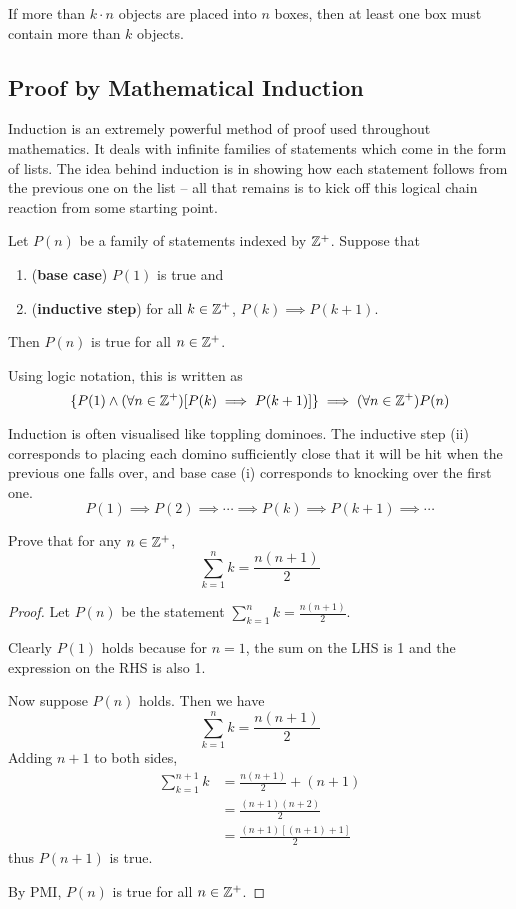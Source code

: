 \begin{theorem}
If more than $k\cdot n$ objects are placed into $n$ boxes, then at least one box must contain more than $k$ objects.
\end{theorem}
\pagebreak

\subsection{Proof by Mathematical Induction}
Induction is an extremely powerful method of proof used throughout mathematics. It deals with infinite families of statements which come in the form of lists. The idea behind induction is in showing how each statement follows from the previous one on the list -- all that remains is to kick off this logical chain reaction from some starting point.

\begin{theorem}
Let $P(n)$ be a family of statements indexed by $\mathbb Z^+$. Suppose that 
\begin{enumerate}[label=(\roman*)]
\item (\textbf{base case}) $P(1)$ is true and
\item (\textbf{inductive step}) for all $k\in\mathbb Z^+$, $P(k)\implies P(k+1)$.
\end{enumerate}
Then $P(n)$ is true for all $n\in\mathbb Z^+$.
\end{theorem}

Using logic notation, this is written as
\[ \{P(1) \land (\forall n \in \mathbb Z^+) [P(k) \implies P(k+1)]\} \implies (\forall n \in \mathbb Z^+)P(n) \]

Induction is often visualised like toppling dominoes. The inductive step (ii) corresponds to placing each domino sufficiently close that it will be hit when the previous one falls over, and base case (i) corresponds to knocking over the first one.
\[ P(1) \implies P(2) \implies \cdots \implies P(k) \implies P(k+1) \implies \cdots \]

\begin{exercise}{}{}
Prove that for any $n \in \mathbb Z^+$,
\[ \sum_{k=1}^n k = \frac{n(n+1)}{2} \]
\end{exercise}

\begin{proof}
Let $P(n)$ be the statement $\sum_{k=1}^n k = \frac{n(n+1)}{2}$.

Clearly $P(1)$ holds because for $n=1$, the sum on the LHS is 1 and the expression on the RHS is also 1.

Now suppose $P(n)$ holds. Then we have
\[ \sum_{k=1}^n k = \frac{n(n+1)}{2} \]
Adding $n+1$ to both sides,
\begin{align*}
\sum_{k=1}^{n+1} k &= \frac{n(n+1)}{2}+(n+1) \\
&= \frac{(n+1)(n+2)}{2} \\
&= \frac{(n+1)[(n+1)+1]}{2}
\end{align*}
thus $P(n+1)$ is true.

By PMI, $P(n)$ is true for all $n \in \mathbb Z^+$.
\end{proof}

